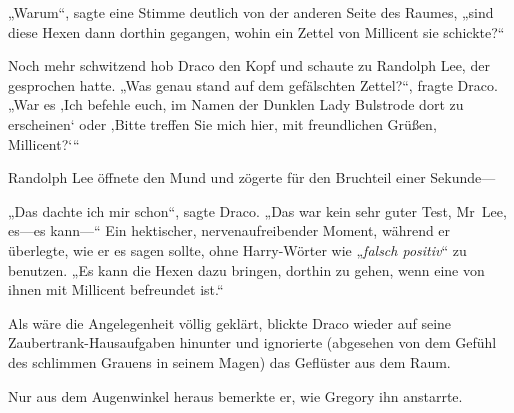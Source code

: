 „Warum“, sagte eine Stimme deutlich von der anderen Seite des Raumes, „sind diese Hexen dann dorthin gegangen, wohin ein Zettel von Millicent sie schickte?“

Noch mehr schwitzend hob Draco den Kopf und schaute zu Randolph Lee, der gesprochen hatte. „Was genau stand auf dem gefälschten Zettel?“, fragte Draco. „War es ‚Ich befehle euch, im Namen der Dunklen Lady Bulstrode dort zu erscheinen‘ oder ‚Bitte treffen Sie mich hier, mit freundlichen Grüßen, Millicent?‘“

Randolph Lee öffnete den Mund und zögerte für den Bruchteil einer Sekunde—

„Das dachte ich mir schon“, sagte Draco. „Das war kein sehr guter Test, Mr~Lee, es—es kann—“ Ein hektischer, nervenaufreibender Moment, während er überlegte, wie er es sagen sollte, ohne Harry-Wörter wie „\emph{falsch positiv}“ zu benutzen. „Es kann die Hexen dazu bringen, dorthin zu gehen, wenn eine von ihnen mit Millicent befreundet ist.“

Als wäre die Angelegenheit völlig geklärt, blickte Draco wieder auf seine Zaubertrank-Hausaufgaben hinunter und ignorierte (abgesehen von dem Gefühl des schlimmen Grauens in seinem Magen) das Geflüster aus dem Raum.

Nur aus dem Augenwinkel heraus bemerkte er, wie Gregory ihn anstarrte.

\later

